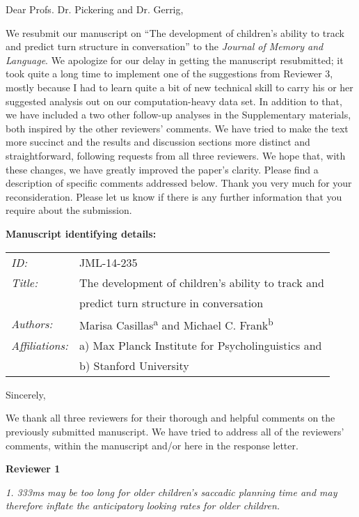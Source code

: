 \documentclass[a4paper]{letter}
\begin{document}
\begin{letter}{}

\opening{Dear Profs. Dr. Pickering and Dr. Gerrig,}

We resubmit our manuscript on ``The development of children's ability to track and predict turn structure in conversation'' to the \textit{Journal of Memory and Language}. We apologize for our delay in getting the manuscript resubmitted; it took quite a long time to implement one of the suggestions from Reviewer 3, mostly because I had to learn quite a bit of new technical skill to carry his or her suggested analysis out on our computation-heavy data set. In addition to that, we have included a two other follow-up analyses in the Supplementary materials, both inspired by the other reviewers' comments. We have tried to make the text more succinct and the results and discussion sections more distinct and straightforward, following requests from all three reviewers. We hope that, with these changes, we have greatly improved the paper's clarity. Please find a description of specific comments addressed below. Thank you very much for your reconsideration. Please let us know if there is any further information that you require about the submission.

\textbf{Manuscript identifying details:}

\begin{tabular}{ll}
\textit{ID:} & JML-14-235 \\
\textit{Title:} & The development of children's ability to track and \\
& predict turn structure in conversation \\
\textit{Authors:} & Marisa Casillas\textsuperscript{a} and Michael C. Frank\textsuperscript{b} \\
\textit{Affiliations:} & a) Max Planck Institute for Psycholinguistics and \\
& b) Stanford University
\end{tabular}

\closing{Sincerely,}

We thank all three reviewers for their thorough and helpful comments on the previously submitted manuscript. We have tried to address all of the reviewers' comments, within the manuscript and/or here in the response letter.

\textbf{Reviewer 1}

\textit{1. 333ms may be too long for older children's saccadic planning time and may therefore inflate the anticipatory looking rates for older children.}


\end{letter}
\end{document}
